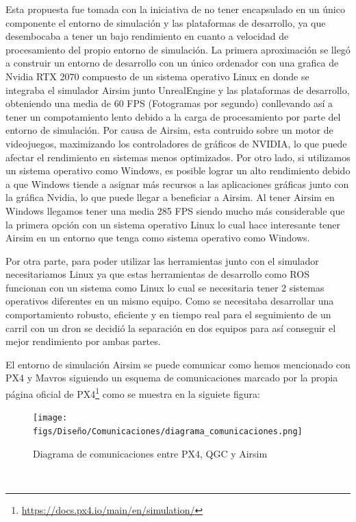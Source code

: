 Esta propuesta fue tomada con la iniciativa de no tener encapsulado en un único componente el entorno de simulación y las plataformas de desarrollo, ya que desembocaba a tener un 
bajo rendimiento en cuanto a velocidad de procesamiento del propio entorno de simulación. La primera aproximación se llegó a construir un entorno de desarrollo con un único ordenador con una grafica
de Nvidia RTX 2070 compuesto de un sistema operativo Linux en donde se integraba el simulador Airsim junto UnrealEngine y las plataformas de desarrollo, obteniendo una media de 60 FPS (Fotogramas por segundo)
conllevando así a tener un compotamiento lento debido a la carga de procesamiento por parte del entorno de simulación. Por causa de Airsim, esta contruido sobre un motor de videojuegos, maximizando los controladores
de gráficos de NVIDIA, lo que puede afectar el rendimiento en sistemas menos optimizados. Por otro lado, si utilizamos un sistema operativo como Windows, es posible lograr un alto rendimiento debido a que Windows
tiende a asignar más recursos a las aplicaciones gráficas junto con la gráfica Nvidia, lo que puede llegar a beneficiar a Airsim. Al tener Airsim en Windows llegamos tener una media 285 FPS siendo
mucho más considerable que la primera opción con un sistema operativo Linux lo cual hace interesante tener Airsim en un entorno que tenga como sistema operativo como Windows. \newline

Por otra parte, para poder utilizar las herramientas junto con el simulador necesitariamos Linux ya que estas herramientas de desarrollo como ROS funcionan con un sistema como Linux lo cual se necesitaria 
tener 2 sistemas operativos diferentes en un mismo equipo. Como se necesitaba desarrollar una comportamiento robusto, eficiente y en tiempo real para el seguimiento de un carril con un dron se decidió
la separación en dos equipos para así conseguir el mejor rendimiento por ambas partes. \newline

El entorno de simulación Airsim se puede comunicar como hemos mencionado con PX4 y Mavros siguiendo un esquema de comunicaciones marcado por la propia página oficial de 
PX4\footnote{\url{https://docs.px4.io/main/en/simulation/}} como se muestra en la siguiete figura:

\begin{figure} [H]
  \begin{center}
    \texttt{[image: figs/Diseño/Comunicaciones/diagrama\_comunicaciones.png]}
  \end{center}
  \caption{Diagrama de comunicaciones entre PX4, QGC y Airsim}
  \label{fig:diagramapx4}
\end{figure}\

